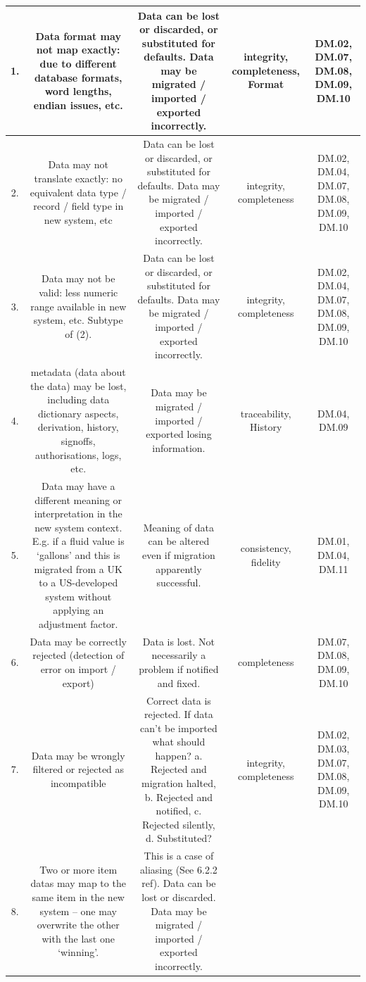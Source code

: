 \begin{longtable}{|C{}|C{}|C{}|C{}|C{}|}
1.&
Data format may not map exactly: due to different \gls{database} formats, word lengths, endian issues, etc.&
Data can be lost or discarded, or substituted for defaults. Data may be migrated / imported / exported incorrectly.&
\Gls{integrity}, \gls{completeness}, Format&
DM.02, DM.07, DM.08, DM.09, DM.10\\\hline
%
2.&
Data may not translate exactly: no equivalent data type / record / field type in new system, etc&
Data can be lost or discarded, or substituted for defaults. Data may be migrated / imported / exported incorrectly.&
\Gls{integrity}, \gls{completeness}&
DM.02, DM.04, DM.07, DM.08, DM.09, DM.10\\\hline
%
3.&
Data may not be valid: less numeric range available in new system, etc. Subtype of (2).&
Data can be lost or discarded, or substituted for defaults. Data may be migrated / imported / exported incorrectly.&
\Gls{integrity}, \gls{completeness}&
DM.02, DM.04, DM.07, DM.08, DM.09, DM.10\\\hline
%
4.&
\Gls{metadata} (data about the data) may be lost, including \gls{data dictionary} aspects, derivation, history, signoffs, authorisations,
logs, etc.&
Data may be migrated / imported / exported losing \gls{information}.&
\Gls{traceability}, History&
DM.04, DM.09\\\hline
%
5.&
Data may have a different meaning or interpretation in the new system context.
E.g. if a fluid value is ‘gallons’ and this is migrated from a UK to a US-developed system without applying an adjustment factor.&
Meaning of data can be altered even if migration apparently successful.&
\Gls{consistency}, \gls{fidelity}&
DM.01, DM.04, DM.11\\\hline
%
6.
&
Data may be correctly rejected (detection of error on import / export)&
Data is lost. Not necessarily a problem if notified and fixed.&
\Gls{completeness}&
DM.07, DM.08, DM.09, DM.10\\\hline
%
7.
&
Data may be wrongly filtered or rejected as incompatible&
Correct data is rejected. If data can’t be imported what should happen? a. Rejected and migration halted,
b. Rejected and notified, c. Rejected silently, d. Substituted?&
\Gls{integrity}, \gls{completeness}&
DM.02, DM.03, DM.07, DM.08, DM.09, DM.10\\\hline
%
8.&
Two or more \glspl{item data} may map to the same item in the new system – one may overwrite the other with the last one ‘winning’.&
This is a case of aliasing (See 6.2.2 ref). Data can be lost or discarded. Data may be migrated / imported / exported incorrectly.&

\end{longtable}
